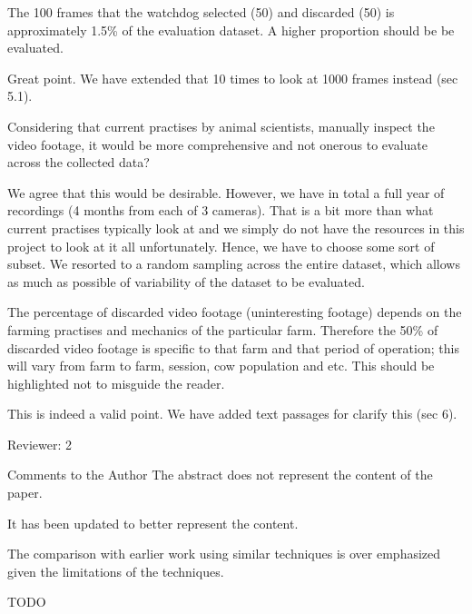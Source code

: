 \documentclass[10pt,a4paper]{letter}
\begin{document}
\begin{letter}{}
\begin{siderules}
The 100 frames that the watchdog selected (50) and discarded (50) is approximately 1.5\% of the evaluation dataset. 
A higher proportion should be be evaluated. 
\end{siderules}

Great point. We have extended that 10 times to look at 1000 frames instead (sec 5.1).

\begin{siderules}
Considering that current practises by animal scientists, manually inspect the video footage, it would be more 
comprehensive and not onerous to evaluate across the collected data?
\end{siderules}

We agree that this would be desirable. However, we have in total a full year of recordings (4 months from each of 3 cameras). 
That is a bit more than what current practises typically look at and
we simply do not have the resources in this project to look at it all unfortunately. 
Hence, we have to choose some sort of subset. We resorted to a random sampling across the
entire dataset, which allows as much as possible of variability of the dataset to be evaluated.

\begin{siderules}
The percentage of discarded video footage (uninteresting footage) depends on the farming practises and mechanics of the particular farm. Therefore the 50\% of discarded video footage is specific to that farm and that period of operation; this will vary from farm to farm, session, cow population and etc. This should be highlighted not to misguide the reader.
\end{siderules}

This is indeed a valid point. We have added text passages for clarify this (sec 6).

\begin{siderules}
Reviewer: 2

Comments to the Author
The abstract does not represent the content of the paper.
\end{siderules}

It has been updated to better represent the content.

\begin{siderules}
The comparison with earlier work using similar techniques is over emphasized given the limitations
of the techniques.
\end{siderules}

TODO


\end{letter}
\end{document}
